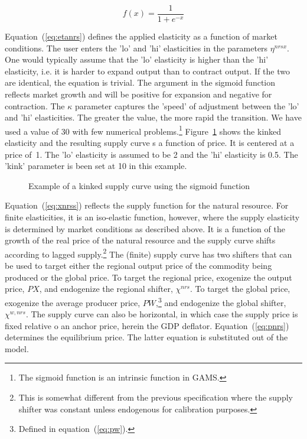 \documentclass[11pt,letterpaper]{report}
\begin{document}
\[
f(x) = \frac{1}{1+e^{-x}}
\]

\noindent Equation~(\ref{eq:etanrs}) defines the applied elasticity as a
function of market conditions. The user enters the 'lo' and 'hi' elasticities in
the parameters $\eta^{\mathit{nrsx}}$. One would typically assume that the 'lo'
elasticity is higher than the 'hi' elasticity, i.e. it is harder to expand
output than to contract output. If the two are identical, the equation is
trivial. The argument in the sigmoid function reflects market growth and will be
positive for expansion and negative for contraction. The $\kappa$ parameter
captures the 'speed' of adjustment between the 'lo' and 'hi' elasticities.
The greater the value, the more rapid the transition. We have used a value of 30
with few numerical problems.\footnote{The sigmoid function is an intrinsic
function in GAMS.} Figure~\ref{fig:kinkSupply} shows the kinked elasticity and
the resulting supply curve s a function of price. It is centered at a price
of~1. The 'lo' elasticity is assumed to be 2 and the 'hi' elasticity is 0.5.
The 'kink' parameter is been set at 10 in this example.


\begin{figure}[ht]
\begin{minipage}{\textwidth}
\centering
   
   \caption{Example of a kinked supply curve using the sigmoid function}
   \label{fig:kinkSupply}
\end{minipage}
\end{figure}

Equation~(\ref{eq:xnrss}) reflects the supply function for the natural resource.
For finite elasticities, it is an iso-elastic function, however, where the
supply elasticity is determined by market conditions as described above. It is a
function of the growth of the real price of the natural resource and the supply
curve shifts according to lagged supply.\footnote{This is somewhat different
from the previous specification where the supply shifter was constant unless
endogenous for calibration purposes.} The (finite) supply curve has two shifters
that can be used to target either the regional output price of the commodity
being produced or the global price. To target the regional price, exogenize the
output price, $\mathit{PX}$, and endogenize the regional shifter,
$\chi^{\mathit{nrs}}$. To target the global price, exogenize the average
producer price, $\mathit{PW}$,\footnote{Defined in equation~(\ref{eq:pw}).} and
endogenize the global shifter, $\chi^{w,\mathit{nrs}}$. The supply curve can
also be horizontal, in which case the supply price is fixed relative o an anchor
price, herein the GDP deflator. Equation~(\ref{eq:pnrs}) determines the
equilibrium price. The latter equation is substituted out of the model.
\end{document}
